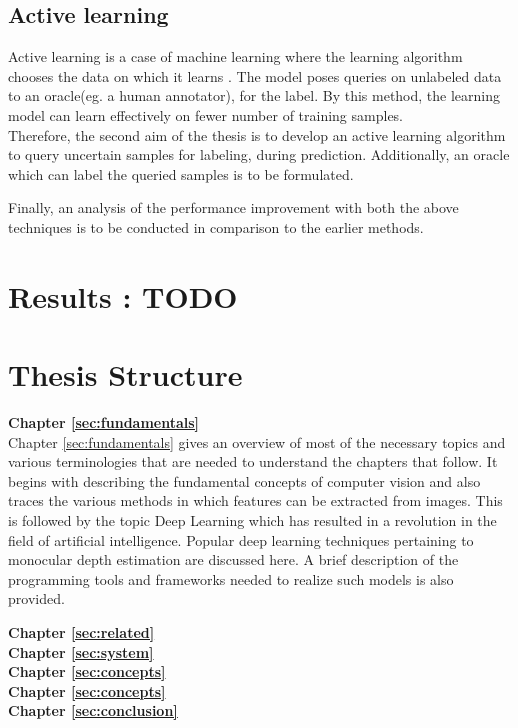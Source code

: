 \subsection{Active learning}
Active learning is a case of machine learning where the learning algorithm chooses the data on which it learns \cite{settles2009active}. The model poses queries on unlabeled data to an oracle(eg. a human annotator), for the label. By this method, the learning model can learn effectively on fewer number of training samples.\\
Therefore, the second aim of the thesis is to develop an active learning algorithm to query uncertain samples for labeling, during prediction. Additionally, an oracle which can label the queried samples is to be formulated.   

Finally, an analysis of the performance improvement with both the above techniques is to be conducted in comparison to the earlier methods.  



\section{Results : TODO}
\label{sec:intro:results}


\section{Thesis Structure}
\label{sec:intro:structure}
\textbf{Chapter \ref{sec:fundamentals}} \\[0.2em]
Chapter \ref{sec:fundamentals}  gives an overview of most of the necessary topics and various terminologies that are needed to understand the chapters that follow. It begins with describing the fundamental concepts of computer vision and also traces the various methods in which features can be extracted from images. This is followed by the topic Deep Learning which has resulted in a revolution in the field of artificial intelligence. Popular deep learning techniques pertaining to monocular depth estimation are discussed here. A brief description of the programming tools and frameworks needed to realize such models is also provided.

\textbf{Chapter \ref{sec:related}} \\[0.2em]


\textbf{Chapter \ref{sec:system}} \\[0.2em]


\textbf{Chapter \ref{sec:concepts}} \\[0.2em]


\textbf{Chapter \ref{sec:concepts}} \\[0.2em]


\textbf{Chapter \ref{sec:conclusion}} \\[0.2em]

